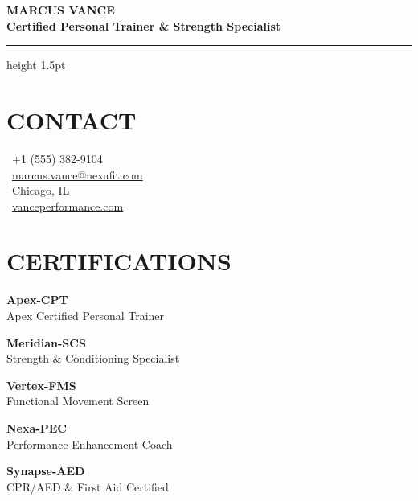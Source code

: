 \documentclass[10pt]{article}
\begin{document}
\pagestyle{empty} %
\setlength{\parindent}{0pt}
\setlength{\parskip}{0pt}

\begin{center}
    {\Huge\bfseries\color{primary} MARCUS VANCE} \\[4pt]
    {\large\bfseries\color{accent} Certified Personal Trainer \& Strength Specialist}
\end{center}
\vspace{4pt}
{\color{rulecolor}\hrule height 1.5pt}
\vspace{10pt}

\begin{minipage}[t]{0.28\textwidth}
  \raggedright
  
  \section*{CONTACT}
  \vspace{4pt}
  {\color{bodytext}\small
  \faPhone\ +1 (555) 382-9104 \\[6pt]
  \faEnvelope\ \href{mailto:marcus.vance@nexafit.com}{marcus.vance@nexafit.com} \\[6pt]
  \faMapMarker\ Chicago, IL \\[6pt]
  \faGlobe\ \href{https://vanceperformance.com}{vanceperformance.com}
  }
  
  \section*{CERTIFICATIONS}
  \vspace{6pt}
  \begin{certbox}
    \textbf{Apex-CPT} \\
    {\scriptsize Apex Certified Personal Trainer}
  \end{certbox}
  \vspace{4pt}
  \begin{certbox}
    \textbf{Meridian-SCS} \\
    {\scriptsize Strength \& Conditioning Specialist}
  \end{certbox}
  \vspace{4pt}
  \begin{certbox}
    \textbf{Vertex-FMS} \\
    {\scriptsize Functional Movement Screen}
  \end{certbox}
  \vspace{4pt}
  \begin{certbox}
    \textbf{Nexa-PEC} \\
    {\scriptsize Performance Enhancement Coach}
  \end{certbox}
  \vspace{4pt}
  \begin{certbox}
    \textbf{Synapse-AED} \\
    {\scriptsize CPR/AED \& First Aid Certified}
  \end{certbox}
  

\end{minipage}
\end{document}
